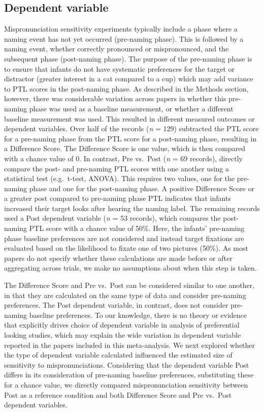 \documentclass[man]{apa6}
\begin{document}
\hypertarget{dependent-variable}{%
\subsection{Dependent variable}\label{dependent-variable}}

Mispronunciation sensitivity experiments typically include a phase where a naming event has not yet occurred (pre-naming phase). This is followed by a naming event, whether correctly pronounced or mispronounced, and the subsequent phase (post-naming phase). The purpose of the pre-naming phase is to ensure that infants do not have systematic preferences for the target or distractor (greater interest in a cat compared to a cup) which may add variance to PTL scores in the post-naming phase. As described in the Methods section, however, there was considerable variation across papers in whether this pre-naming phase was used as a baseline measurement, or whether a different baseline measurement was used. This resulted in different measured outcomes or dependent variables. Over half of the records (\emph{n} = 129) subtracted the PTL score for a pre-naming phase from the PTL score for a post-naming phase, resulting in a Difference Score. The Difference Score is one value, which is then compared with a chance value of 0. In contrast, Pre vs.~Post (\emph{n} = 69 records), directly compare the post- and pre-naming PTL scores with one another using a statistical test (e.g.~t-test, ANOVA). This requires two values, one for the pre-naming phase and one for the post-naming phase. A positive Difference Score or a greater post compared to pre-naming phase PTL indicates that infants increased their target looks after hearing the naming label. The remaining records used a Post dependent variable (\emph{n} = 53 records), which compares the post-naming PTL score with a chance value of 50\%. Here, the infants' pre-naming phase baseline preferences are not considered and instead target fixations are evaluated based on the likelihood to fixate one of two pictures (50\%). As most papers do not specify whether these calculations are made before or after aggregating across trials, we make no assumptions about when this step is taken.

The Difference Score and Pre vs.~Post can be considered similar to one another, in that they are calculated on the same type of data and consider pre-naming preferences. The Post dependent variable, in contrast, does not consider pre-naming baseline preferences. To our knowledge, there is no theory or evidence that explicitly drives choice of dependent variable in analysis of preferential looking studies, which may explain the wide variation in dependent variable reported in the papers included in this meta-analysis. We next explored whether the type of dependent variable calculated influenced the estimated size of sensitivity to mispronunciations. Considering that the dependent variable Post differs in its consideration of pre-naming baseline preferences, substituting these for a chance value, we directly compared mispronunciation sensitivity between Post as a reference condition and both Difference Score and Pre vs.~Post dependent variables.
\end{document}
